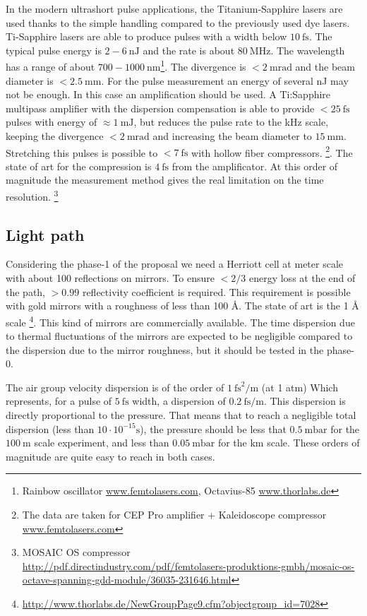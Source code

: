 \documentclass[9pt, a4, twoside]{article}
\begin{document}
In  the modern ultrashort pulse applications, the Titanium-Sapphire lasers are used thanks to the simple handling compared to the previously used dye lasers. Ti-Sapphire lasers are able to produce pulses with a width  below $10~\mathrm{fs}$. The typical pulse energy is $2-6~\mathrm{nJ}$ and the rate is about $80~\mathrm{MHz}$. The wavelength has a range of about $700-1000~\mathrm{nm}$\footnote{Rainbow oscillator \url{www.femtolasers.com}, Octavius-85 \url{www.thorlabs.de}}. The  divergence  is $<2~\mathrm{mrad}$ and the beam diameter is $< 2.5~\mathrm{mm}$. For the pulse measurement an energy of several nJ may not be enough. In this case an  amplification should be used. A Ti:Sapphire multipass amplifier with the dispersion compensation is able to provide $<25~\mathrm{fs}$ pulses with energy  of $\approx1~\mathrm{mJ}$, but reduces the pulse rate to the kHz scale, keeping the divergence $<2~\mathrm{mrad}$  and increasing the beam diameter to $15~\mathrm{mm}$. Stretching this pulses is possible to $<7~\mathrm{fs}$ with hollow  fiber compressors. \footnote{The data are taken for CEP Pro amplifier + Kaleidoscope compressor \url{www.femtolasers.com}}. The state of art for the compression is $4~\mathrm{fs}$ from the amplificator. At this order of magnitude the measurement method gives the real limitation on the time resolution. \footnote{MOSAIC OS compressor\\ \url{http://pdf.directindustry.com/pdf/femtolasers-produktions-gmbh/mosaic-os-octave-spanning-gdd-module/36035-231646.html}}

\subsection{Light path}

Considering the phase-1 of the proposal we need a Herriott cell at meter scale with about 100 reflections on mirrors. To ensure $< 2/3$ energy loss at the end of the path, $>0.99$ reflectivity coefficient is required. This requirement is possible with gold mirrors with a roughness of less than 100 Å. The state of art is the 1 Å scale  \footnote{\url{http://www.thorlabs.de/NewGroupPage9.cfm?objectgroup_id=7028}}. This kind of mirrors are commercially available. The time dispersion due to thermal fluctuations of the mirrors are expected to be negligible compared to the dispersion due to the mirror roughness, but it should be tested in the phase-0.

The air group velocity dispersion is of the order of $1~\mathrm{fs}^2/\mathrm{m}$ (at 1 atm) \cite{airdispertion} Which represents, for a pulse of $5~\mathrm{fs}$ width, a dispersion of $0.2~\mathrm{fs}/\mathrm{m}$. This dispersion is directly proportional to the pressure. That means that to reach a negligible total dispersion (less than $10\cdot10^{-15}\mathrm{s}$), the pressure should be less that $0.5~\mathrm{mbar}$ for the $100~\mathrm{m}$ scale experiment, and less than $0.05~\mathrm{mbar}$ for the km scale. These orders of magnitude are quite easy to reach in both cases.
\end{document}
